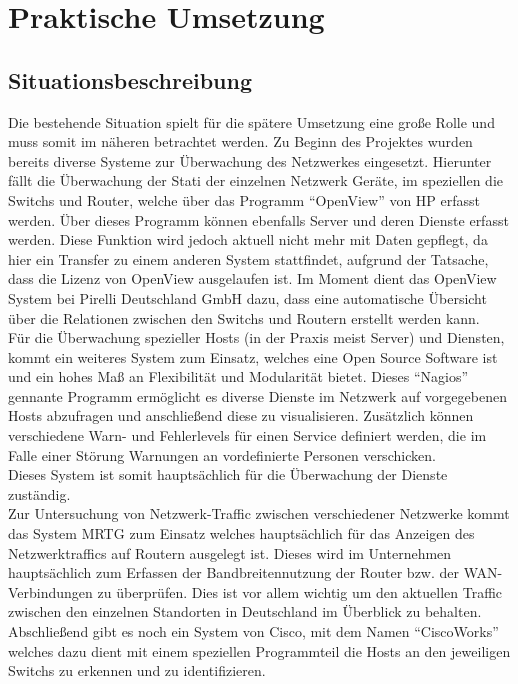 \chapter{Praktische Umsetzung}
\label{cha:praxis}

\section{Situationsbeschreibung}
\label{sec:situation}

Die bestehende Situation spielt für die spätere Umsetzung eine große Rolle und muss somit im näheren betrachtet werden.
Zu Beginn des Projektes wurden bereits diverse Systeme zur Überwachung des Netzwerkes eingesetzt. Hierunter fällt die Überwachung der Stati der einzelnen Netzwerk Geräte, im speziellen die Switchs und Router, welche über das Programm “OpenView” von HP erfasst werden. Über dieses Programm können ebenfalls Server und deren Dienste erfasst werden. Diese Funktion wird jedoch aktuell nicht mehr mit Daten gepflegt, da hier ein Transfer zu einem anderen System stattfindet, aufgrund der Tatsache, dass die Lizenz von OpenView ausgelaufen ist. Im Moment dient das OpenView System bei Pirelli Deutschland GmbH dazu, dass eine automatische Übersicht über die Relationen zwischen den Switchs und Routern erstellt werden kann.\\
Für die Überwachung spezieller Hosts (in der Praxis meist Server) und Diensten, kommt ein weiteres System zum Einsatz, welches eine Open Source Software ist und ein hohes Maß an Flexibilität und Modularität bietet. Dieses “Nagios” gennante Programm ermöglicht es diverse Dienste im Netzwerk auf vorgegebenen Hosts abzufragen und anschließend diese zu visualisieren. Zusätzlich können verschiedene Warn- und Fehlerlevels für einen Service definiert werden, die im Falle einer Störung Warnungen an vordefinierte Personen verschicken.\\
Dieses System ist somit hauptsächlich für die Überwachung der Dienste zuständig.\\
Zur Untersuchung von Netzwerk-Traffic zwischen verschiedener Netzwerke kommt das System MRTG zum Einsatz welches hauptsächlich für das Anzeigen des Netzwerktraffics auf Routern ausgelegt ist.
Dieses wird im Unternehmen hauptsächlich zum Erfassen der Bandbreitennutzung der Router bzw. der WAN-Verbindungen zu überprüfen.
Dies ist vor allem wichtig um den aktuellen Traffic zwischen den einzelnen Standorten in Deutschland im Überblick zu behalten.\\
Abschließend gibt es noch ein System von Cisco, mit dem Namen “CiscoWorks” welches dazu dient mit einem speziellen Programmteil die Hosts an den jeweiligen Switchs zu erkennen und zu identifizieren.
